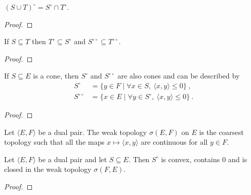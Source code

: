 \begin{lemma}\label{lem:polarSet_union}
$(S \cup T)^\circ = S^\circ \cap T^\circ$.
\end{lemma}

\begin{proof}

\end{proof}


\begin{lemma}\label{lem:polarSet_anti}
If $S \subseteq T$ then $T^\circ \subseteq S^\circ$ and $S^{\circ\circ} \subseteq T^{\circ\circ}$.
\end{lemma}

\begin{proof}

\end{proof}


\begin{lemma}\label{lem:polarSet_convexCone}
If $S \subseteq E$ is a cone, then $S^\circ$ and $S^{\circ\circ}$ are also cones and can be described by
\begin{align*}
  S^\circ
  &= \{y \in F \mid \forall x \in S, \: \langle x, y \rangle \le 0\}
  \: , \\
  S^{\circ\circ}
  &= \{x \in E \mid \forall y \in S^\circ, \: \langle x, y \rangle \le 0\}
  \: .
\end{align*}
\end{lemma}

\begin{proof}

\end{proof}


\begin{definition}\label{def:weakTopology}
  \mathlibok
Let $\langle E, F \rangle$ be a dual pair.
The weak topology $\sigma(E, F)$ on $E$ is the coarsest topology such that all the maps $x \mapsto \langle x, y \rangle$ are continuous for all $y \in F$.
\end{definition}


\begin{lemma}\label{lem:isClosed_polarSet}
Let $\langle E, F \rangle$ be a dual pair and let $S \subseteq E$.
Then $S^\circ$ is convex, contains 0 and is closed in the weak topology $\sigma(F, E)$.
\end{lemma}

\begin{proof}

\end{proof}


